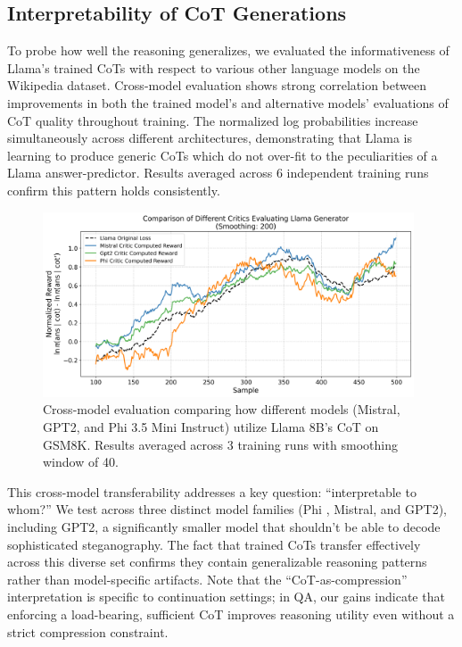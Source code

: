 \documentclass{article} %
\begin{document}
\subsection{Interpretability of CoT Generations}
\label{subsec:interp}

To probe how well the reasoning generalizes, we evaluated the informativeness of Llama's trained CoTs with respect to various other language models on the Wikipedia dataset. Cross-model evaluation shows strong correlation between improvements in both the trained model's and alternative models' evaluations of CoT quality throughout training. The normalized log probabilities increase simultaneously across different architectures, demonstrating that Llama is learning to produce generic CoTs which do not over-fit to the peculiarities of a Llama answer-predictor. Results averaged across 6 independent training runs confirm this pattern holds consistently. 

\begin{figure}[ht]
    \centering
    \includegraphics[width=0.98\textwidth]{Figures/gsm8k_multiple_critics_comparison.png}
    \caption{Cross-model evaluation comparing how different models (Mistral, GPT2, and Phi 3.5 Mini Instruct) utilize Llama 8B's CoT on GSM8K. Results averaged across 3 training runs with smoothing window of 40.}
    \label{fig:original_vs_llama}
\end{figure}

This cross-model transferability addresses a key question: ``interpretable to whom?'' We test across three distinct model families (Phi \citep{abdin2024phi3technicalreporthighly}, Mistral, and GPT2), including GPT2, a significantly smaller model that shouldn't be able to decode sophisticated steganography. The fact that trained CoTs transfer effectively across this diverse set confirms they contain generalizable reasoning patterns rather than model-specific artifacts. Note that the ``CoT-as-compression'' interpretation is specific to continuation settings; in QA, our gains indicate that enforcing a load-bearing, sufficient CoT improves reasoning utility even without a strict compression constraint.
\end{document}

